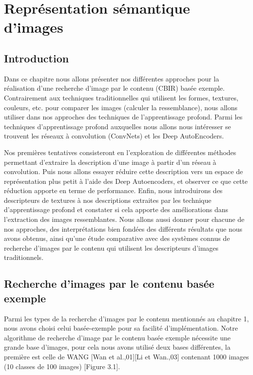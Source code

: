 
\chapter{Représentation sémantique d'images} %

\section{Introduction}
	Dans ce chapitre nous allons présenter nos différentes approches pour la réalisation d'une recherche d'image par le contenu (CBIR) basée exemple. Contrairement aux techniques traditionnelles qui utilisent les formes, textures, couleurs, etc. pour comparer les images (calculer la ressemblance), nous allons utiliser dans nos approches des techniques de l'apprentissage profond. Parmi les techniques d'apprentissage profond auxquelles nous allons nous intéresser se trouvent les réseaux à convolution (ConvNets) et les Deep AutoEncoders. 
	
	Nos premières tentatives consisteront en l'exploration de différentes méthodes permettant d'extraire la description d'une image à partir d'un réseau à convolution. Puis nous allons essayer réduire cette description vers un espace de représentation plus petit à l'aide des Deep Autoencoders, et observer ce que cette réduction apporte en terme de performance. Enfin, nous introduirons des descripteurs de textures à nos descriptions extraites par les technique d'apprentissage profond et constater si cela apporte des améliorations dans l'extraction des images ressemblantes. Nous allons aussi donner pour chacune de nos approches, des interprétations bien fondées des différents résultats que nous avons obtenus, ainsi qu'une étude comparative avec des systèmes connus de recherche d'images par le contenu qui utilisent les descripteurs d'images traditionnels.
	
	


\section{Recherche d'images par le contenu basée exemple}
	Parmi les types de la recherche d'images par le contenu mentionnés au chapitre 1, nous avons choisi celui basée-exemple pour sa facilité d'implémentation. Notre algorithme de recherche d'image par le contenu basée exemple nécessite une grande base d'images, pour cela nous avons utilisé deux bases différentes, la première est celle de WANG [Wan et al.,01][Li et Wan.,03] contenant 1000 images (10 classes de 100 images) [Figure 3.1].


